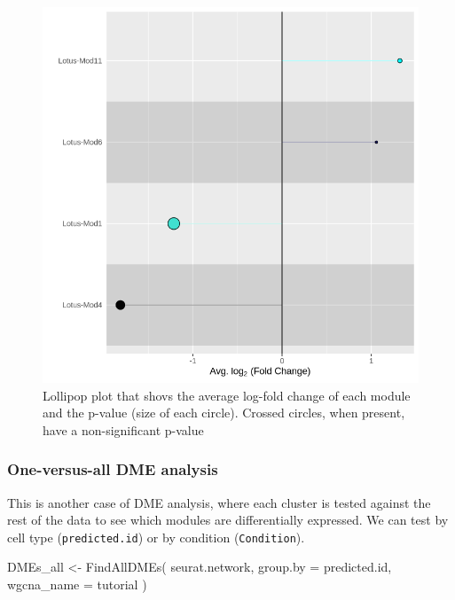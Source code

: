 \documentclass[
  letterpaper,
  DIV=11,
  numbers=noendperiod]{scrartcl}
\newenvironment{Shaded}{\begin{snugshade}}{\end{snugshade}}
\newcommand{\AttributeTok}[1]{\textcolor[rgb]{0.49,0.56,0.16}{#1}}
\newcommand{\FunctionTok}[1]{\textcolor[rgb]{0.02,0.16,0.49}{#1}}
\newcommand{\NormalTok}[1]{\textcolor[rgb]{0.00,0.44,0.13}{#1}}
\newcommand{\OtherTok}[1]{\textcolor[rgb]{0.00,0.44,0.13}{#1}}
\newcommand{\StringTok}[1]{\textcolor[rgb]{0.25,0.44,0.63}{#1}}
\begin{document}
\begin{figure}[H]

{\centering \includegraphics{notebook_files/figure-pdf/fig-lol-output-3.png}

}

\caption{\label{fig-lol}Lollipop plot that shovs the average log-fold
change of each module and the p-value (size of each circle). Crossed
circles, when present, have a non-significant p-value}

\end{figure}

\hypertarget{one-versus-all-dme-analysis}{%
\subsubsection{One-versus-all DME
analysis}\label{one-versus-all-dme-analysis}}

This is another case of DME analysis, where each cluster is tested
against the rest of the data to see which modules are differentially
expressed. We can test by cell type (\texttt{predicted.id}) or by
condition (\texttt{Condition}).

\begin{Shaded}
\begin{Highlighting}[]
\NormalTok{DMEs\_all }\OtherTok{\textless{}{-}} \FunctionTok{FindAllDMEs}\NormalTok{(}
\NormalTok{  seurat.network,}
  \AttributeTok{group.by =} \StringTok{\textquotesingle{}predicted.id\textquotesingle{}}\NormalTok{,}
  \AttributeTok{wgcna\_name =} \StringTok{\textquotesingle{}tutorial\textquotesingle{}}
\NormalTok{) }
\end{Highlighting}
\end{Shaded}
\end{document}
